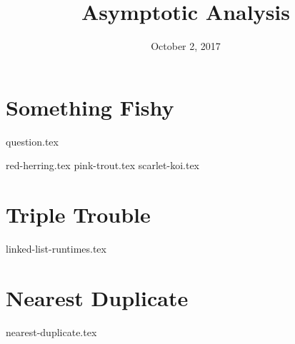 \documentclass[11pt]{exam}
\title{Asymptotic Analysis}
\date{October 2, 2017}
\begin{document}
\maketitle

\section{Something Fishy}
{question.tex}
\begin{questions}
{red-herring.tex}
{pink-trout.tex}
{scarlet-koi.tex}
\end{questions}

\section{Triple Trouble}
\begin{questions}
{linked-list-runtimes.tex}
\end{questions}

\section{Nearest Duplicate}
\begin{questions}
{nearest-duplicate.tex}
\end{questions}
\end{document}
